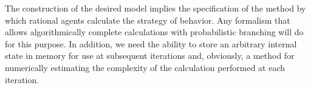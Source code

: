 The construction of the desired model implies the specification of the method by which rational agents calculate the strategy of behavior. Any formalism that allows algorithmically complete calculations with probabilistic branching will do for this purpose. In addition, we need the ability to store an arbitrary internal state in memory for use at subsequent iterations and, obviously, a method for numerically estimating the complexity of the calculation performed at each iteration. %
